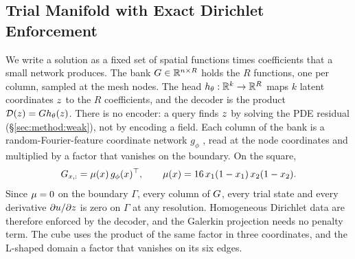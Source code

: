 \documentclass{article}
\begin{document}
\subsection{Trial Manifold with Exact Dirichlet Enforcement}
\label{sec:method:manifold}

We write a solution as a fixed set of spatial functions times
coefficients that a small network produces. The bank
$G\in\mathbb{R}^{n\times R}$ holds the $R$ functions, one per column,
sampled at the mesh nodes. The head $h_\theta:\mathbb{R}^{k}\to\mathbb{R}^{R}$ maps
$k$ latent coordinates $z$ to the $R$ coefficients, and the decoder
is the product $\mathcal D(z)=Gh_\theta(z)$. There is no
encoder: a query finds $z$ by solving the PDE residual
(\S\ref{sec:method:weak}), not by encoding a field. Each column of the
bank is a random-Fourier-feature coordinate network $g_\phi$
\citep{Tancik2020FourierFeatures}, read at the node coordinates and
multiplied by a factor that vanishes on the boundary. On the square,
\begin{equation}
  G_{x,:} = \mu(x)\,g_\phi(x)^{\top},
  \qquad
  \mu(x) = 16\,x_1(1-x_1)\,x_2(1-x_2).
  \label{eq:bank}
\end{equation}
Since $\mu=0$ on the boundary $\Gamma$, every column of $G$, every
trial state and every derivative $\partial u/\partial z$ is zero on
$\Gamma$ at any resolution. Homogeneous Dirichlet data are therefore
enforced by the decoder, and the Galerkin projection needs no penalty
term. The cube uses the product of the same factor in three coordinates,
and the L-shaped domain a factor that vanishes on its six edges.
\end{document}
